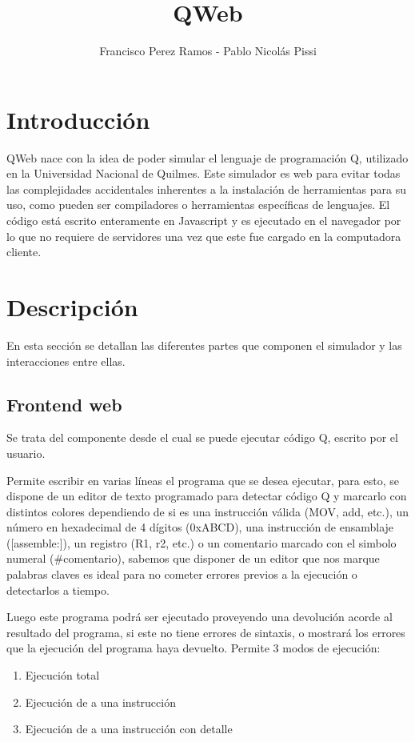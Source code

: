 \documentclass{article}
\title{QWeb}
\author{Francisco Perez Ramos - Pablo Nicolás Pissi}
\date{}
\begin{document}
\maketitle

\section*{Introducción}
QWeb nace con la idea de poder simular el lenguaje de programación Q, utilizado en la Universidad Nacional de Quilmes. Este simulador es web para evitar todas las complejidades accidentales inherentes a la instalación de herramientas para su uso, como pueden ser compiladores o herramientas específicas de lenguajes.
El código está escrito enteramente en Javascript y es ejecutado en el navegador por lo que no requiere de servidores una vez que este fue cargado en la computadora cliente.

\section*{Descripción}
En esta sección se detallan las diferentes partes que componen el simulador y las interacciones entre ellas.

\subsection*{Frontend web}

Se trata del componente desde el cual se puede ejecutar código Q, escrito por el usuario.

Permite escribir en varias líneas el programa que se desea ejecutar, para esto, se dispone de un editor de texto programado para detectar código Q y marcarlo con distintos colores dependiendo de si es una instrucción válida (MOV, add, etc.), un número en hexadecimal de 4 dígitos (0xABCD), una instrucción de ensamblaje ([assemble:]), un registro (R1, r2, etc.) o un comentario marcado con el simbolo numeral (#comentario), sabemos que disponer de un editor que nos marque palabras claves es ideal para no cometer errores previos a la ejecución o detectarlos a tiempo.

Luego este programa podrá ser ejecutado proveyendo una devolución acorde al resultado del programa, si este no tiene errores de sintaxis, o mostrará los errores que la ejecución del programa haya devuelto.
Permite 3 modos de ejecución:

\begin{enumerate}
	\item Ejecución total
	\item Ejecución de a una instrucción
	\item Ejecución de a una instrucción con detalle
\end{enumerate}
\end{document}
